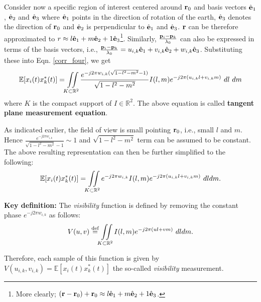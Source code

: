 \documentclass{article}
\begin{document}
Consider now a specific region of interest centered around ${\bf r}_0$ and basis vectors $\hat{{\bf e}}_1$, $\hat{{\bf e}}_2$ and $\hat{{\bf e}}_3$ where $\hat{{\bf e}}_1$ points in the direction of rotation of the earth, $\hat{{\bf e}}_3$ denotes the direction of ${\bf r}_0$ and $\hat{{\bf e}}_2$ is perpendicular to $\hat{{\bf e}}_1$ and $\hat{{\bf e}}_3$. ${\bf r}$ can be therefore approximated to $r \approx l\hat{{\bf e}}_1 + m\hat{{\bf e}}_2 +1\hat{{\bf e}}_3$\footnote{More clearly; $ ({\bf r}-{\bf r}_0) + {\bf r}_0 \approx l\hat{{\bf e}}_1 + m\hat{{\bf e}}_2 +1\hat{{\bf e}}_3$.}. Similarly, $\frac{{\bf p}_i -{\bf p}_k}{\lambda_0}$ can also be expressed in terms of the basis vectors, i.e., $\frac{{\bf p}_i -{\bf p}_k}{\lambda_0} = u_{i,k}\hat{{\bf e}}_1+v_{i,k}\hat{{\bf e}}_2+w_{i,k}\hat{{\bf e}}_3$. Substituting these into Eqn. \ref{corr_four}, we get
\begin{equation}
 \mathbb{E}[x_i(t)x^*_k(t)] =   \iint\displaylimits_{K\subset \mathbb{R}^2} \frac{e^{-j2\pi w_{i,k} (\sqrt{1-l^2-m^2}-1)}}{\sqrt{1-l^2-m^2}} {I}(l,m)e^{-j2\pi (u_{i,k}l+v_{i,k}m)} \   dl\ dm \label{tangent_plane}
\end{equation}
where $K$ is the compact support of $I \in \mathbb{R}^2$. The above equation is called {\bf tangent plane measurement equation}.

As indicated earlier, the field of view is small pointing ${\bf r}_0$, i.e., small $l$ and $m$. Hence $\frac{e^{-j2\pi w_{i,k} }}{\sqrt{1-l^2-m^2}-1} \sim 1$ and $\sqrt{1-l^2-m^2}$ term can be assumed to be constant. The above resulting representation can then be further simplified to the following:
\begin{equation}
 \mathbb{E}[x_i(t)x^*_k(t)] =   \iint\displaylimits_{K\subset \mathbb{R}^2} e^{-j2\pi w_{i,k}}{I}(l,m) e^{-j2\pi (u_{i,k}l+v_{i,k}m)} \   dldm.
\end{equation}

{\bf{Key definition:}} The {\it{visibility}} function is defined by removing the constant phase $e^{-j2\pi w_{i,k}}$ as follows:
\begin{equation}
V(u, v) \stackrel{{\text{def}}}{=} \iint\displaylimits_{K\subset \mathbb{R}^2} {I}(l, m)e^{-j2\pi (ul+vm)}\ dldm.
\end{equation}

Therefore, each sample of this function is given by $V(u_{i,k}, v_{i,k}) = \mathbb{E}[x_i(t)x^*_k(t)]$ the so-called {\it{visibility}} measurement. 
\end{document}
